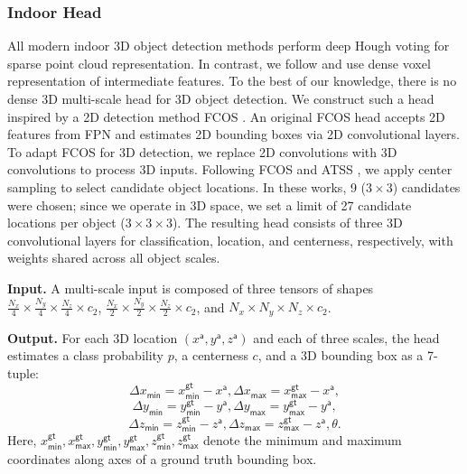 \documentclass[10pt,twocolumn,letterpaper]{article}
\begin{document}
\subsubsection{Indoor Head} \label{sec:indoor}

All modern indoor 3D object detection methods \cite{qi2019votenet, qi2020imvotenet, zhang2020h3dnet} perform deep Hough voting for sparse point cloud representation. In contrast, we follow \cite{murez2020atlas, hou20193dsis} and use dense voxel representation of intermediate features. To the best of our knowledge, there is no dense 3D multi-scale head for 3D object detection. We construct such a head inspired by a 2D detection method FCOS \cite{tian2019fcos}. An original FCOS head accepts 2D features from FPN and estimates 2D bounding boxes via 2D convolutional layers. To adapt FCOS for 3D detection, we replace 2D convolutions with 3D convolutions to process 3D inputs. Following FCOS and ATSS \cite{zhang2020atss}, we apply center sampling to select candidate object locations. In these works, 9 ($3 \times 3$) candidates were chosen; since we operate in 3D space, we set a limit of 27 candidate locations per object ($3 \times 3 \times 3$). The resulting head consists of three 3D convolutional layers for classification, location, and centerness, respectively, with weights shared across all object scales.

\textbf{Input.} A multi-scale input is composed of three tensors of shapes $\frac{N_x}{4} \times \frac{N_y}{4} \times \frac{N_z}{4} \times c_2$, $\frac{N_x}{2} \times \frac{N_y}{2} \times \frac{N_z}{2} \times c_2$, and $N_x \times N_y \times N_z \times c_2$. 

\textbf{Output.} For each 3D location $(x^\mathsf{a}, y^\mathsf{a}, z^\mathsf{a})$ and each of three scales, the head estimates a class probability $p$, a centerness $c$, and a 3D bounding box as a 7-tuple:
\[\Delta x_\mathsf{min}=x_\mathsf{min}^\mathsf{gt}-x^\mathsf{a}, \Delta x_\mathsf{max}=x_\mathsf{max}^\mathsf{gt}-x^\mathsf{a},\]
\[ \Delta y_\mathsf{min}=y_\mathsf{min}^\mathsf{gt}-y^\mathsf{a}, \Delta y_\mathsf{max}=y_\mathsf{max}^\mathsf{gt}-y^\mathsf{a},\]
\[ \Delta z_\mathsf{min}=z_\mathsf{min}^\mathsf{gt}-z^\mathsf{a}, \Delta z_\mathsf{max}=z_\mathsf{max}^\mathsf{gt}-z^\mathsf{a},\theta.\]
Here, $x_\mathsf{min}^\mathsf{gt}, x_\mathsf{max}^\mathsf{gt}, y_\mathsf{min}^\mathsf{gt}, y_\mathsf{max}^\mathsf{gt}, z_\mathsf{min}^\mathsf{gt}, z_\mathsf{max}^\mathsf{gt}$ denote the minimum and maximum coordinates along axes of a ground truth bounding box.
\end{document}

